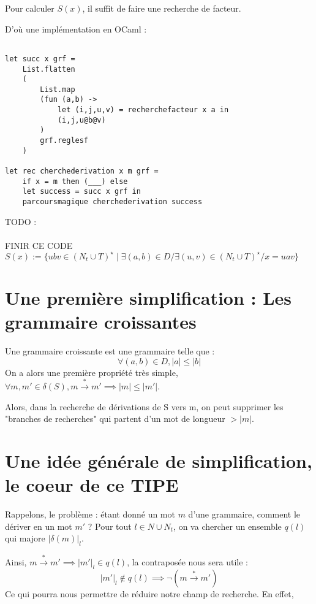 \documentclass[a4paper,12pt]{article}
\newcommand{\norm}[1]{\lvert #1 \rvert}
\begin{document}
Pour calculer $S(x)$, il suffit de faire une recherche de facteur.

D'où une implémentation en OCaml : 
\begin{verbatim}

let succ x grf = 
    List.flatten
    (
        List.map 
        (fun (a,b) ->
            let (i,j,u,v) = recherchefacteur x a in
            (i,j,u@b@v)
        )
        grf.reglesf
    )

let rec cherchederivation x m grf =
    if x = m then (___) else
    let success = succ x grf in 
    parcoursmagique cherchederivation success
\end{verbatim}

{\color{red} TODO :\\\\  FINIR CE CODE }\\
$S(x):= \{ubv \in (N_t \cup T)^\star \mid \exists (a,b) \in D / \exists (u,v)\in (N_t \cup T)^\star / x = uav\}$

\section{Une première simplification : Les grammaire croissantes}

Une grammaire croissante est une grammaire telle que :
\begin{equation}\forall (a,b) \in D, \norm{a} \leq \norm{b} \end{equation}
On a alors une première propriété très simple, $\forall m, m' \in \delta (S), m \overset{*}{\rightarrow} m' \implies \norm{m} \leq \norm{m'}$.

Alors, dans la recherche de dérivations de S vers m, on peut supprimer les "branches de recherches" qui partent d'un mot de longueur $> \norm{m}$.

\section{Une idée générale de simplification, le coeur de ce TIPE}
Rappelons, le problème : étant donné un mot $m$ d'une grammaire, comment le dériver en un mot $m'$ ?
Pour tout $l \in N\cup N_t$, on va chercher un ensemble $q(l)$ qui majore $\norm{\delta(m)}_l$.

Ainsi, $m \overset{*}{\rightarrow} m' \implies \norm{m'}_l \in q(l)$, la contraposée nous sera utile : 
\begin{equation*}
\norm{m'}_l \notin q(l) \implies  \neg (m \overset{*}{\rightarrow} m')
\end{equation*}
Ce qui pourra nous permettre de réduire notre champ de recherche.
En effet, 
\end{document}
